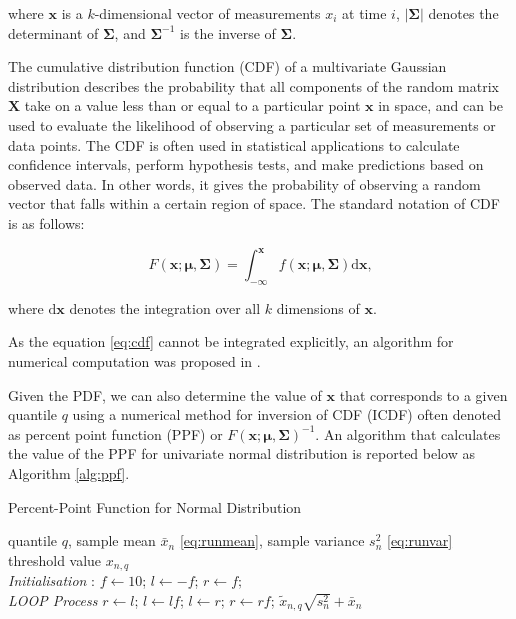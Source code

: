 where $\boldsymbol{x}$ is a $k$-dimensional vector of measurements $x_i$ at time $i$, $|\boldsymbol{\Sigma}|$ denotes the determinant of $\boldsymbol{\Sigma}$, and $\boldsymbol{\Sigma}^{-1}$ is the inverse of $\boldsymbol{\Sigma}$.

The cumulative distribution function (CDF) of a multivariate Gaussian distribution describes the probability that all components of the random matrix \(\boldsymbol{X}\) take on a value less than or equal to a particular point \(\boldsymbol{x}\) in space, and can be used to evaluate the likelihood of observing a particular set of measurements or data points. The CDF is often used in statistical applications to calculate confidence intervals, perform hypothesis tests, and make predictions based on observed data. In other words, it gives the probability of observing a random vector that falls within a certain region of space. The standard notation of CDF is as follows:

\begin{equation}
F(\boldsymbol{x}; \boldsymbol{\mu}, \boldsymbol{\Sigma}) = \int_{-\infty}^{\boldsymbol{x}} f(\boldsymbol{x}; \boldsymbol{\mu}, \boldsymbol{\Sigma})  \text{d}\boldsymbol{x}\text{,}\label{eq:cdf}
\end{equation}

where $\text{d}\boldsymbol{x}$ denotes the integration over all $k$ dimensions of $\boldsymbol{x}$.

As the equation \eqref{eq:cdf} cannot be integrated explicitly, an algorithm for numerical computation was proposed in \cite{Genz2000}.


Given the PDF, we can also determine the value of \(\boldsymbol{x}\) that corresponds to a given quantile $q$  using a numerical method for inversion of CDF (ICDF) often denoted as percent point function (PPF) or $F(\boldsymbol{x}; \boldsymbol{\mu}, \boldsymbol{\Sigma})^{-1}$. An algorithm that calculates the value of the PPF for univariate normal distribution is reported below as Algorithm \ref{alg:ppf}.

\begin{algorithm}[H]
\caption{{Percent-Point Function for Normal Distribution}} \label{alg:ppf}
 \begin{algorithmic}[1]
 \renewcommand{\algorithmicrequire}{\textbf{Input:}}
 \renewcommand{\algorithmicensure}{\textbf{Output:}}
 \REQUIRE quantile $q$, sample mean $\bar x_n$ \eqref{eq:runmean}, sample variance $s^2_n$ \eqref{eq:runvar}
 \ENSURE  threshold value $x_{n,q}$
 \\ \textit{Initialisation} :
  \STATE $f \leftarrow 10$; $l \leftarrow -f $; $r \leftarrow f;$
 \\ \textit{LOOP Process}
  \STATE $r \leftarrow l $;
  \STATE $l \leftarrow lf $;
  \ENDWHILE
    \STATE $l \leftarrow r $;
    \STATE $r \leftarrow rf $;
  \ENDWHILE
 \RETURN $\tilde{x}_{n,q}  \sqrt{s^2_n} + \bar x_n $
 \end{algorithmic}
\end{algorithm}

